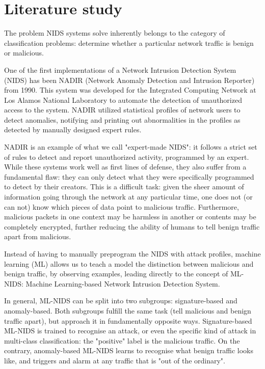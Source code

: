 \section{Literature study}\label{lit_study}
The problem NIDS systems solve inherently belongs to the category of classification problems: determine whether a particular network traffic is benign or malicious.

One of the first implementations of a Network Intrusion Detection System (NIDS) has been NADIR (Network Anomaly Detection and Intrusion Reporter) \cite{nadir} from 1990. This system was developed for the Integrated Computing Network at Los Alamos National Laboratory to automate the detection of unauthorized access to the system. NADIR utilized statistical profiles of network users to detect anomalies, notifying and printing out abnormalities in the profiles as detected by manually designed expert rules.

NADIR is an example of what we call "expert-made NIDS": it follows a strict set of rules to detect and report unauthorized activity, programmed by an expert. While these systems work well as first lines of defense, they also suffer from a fundamental flaw: they can only detect what they were specifically programmed to detect by their creators. This is a difficult task: given the sheer amount of information going through the network at any particular time, one does not (or can not) know which pieces of data point to malicious traffic. Furthermore, malicious packets in one context may be harmless in another or contents may be completely encrypted, further reducing the ability of humans to tell benign traffic apart from malicious. 

Instead of having to manually preprogram the NIDS with attack profiles, machine learning (ML) allows us to teach a model the distinction between malicious and benign traffic, by observing examples, leading directly to the concept of ML-NIDS: Machine Learning-based Network Intrusion Detection System.

In general, ML-NIDS can be split into two subgroups: signature-based and anomaly-based. Both subgroups fulfill the same task (tell malicious and benign traffic apart), but approach it in fundamentally opposite ways. Signature-based ML-NIDS is trained to recognise an attack, or even the specific kind of attack in multi-class classification: the "positive" label is the malicious traffic. On the contrary, anomaly-based ML-NIDS learns to recognise what benign traffic looks like, and triggers and alarm at any traffic that is "out of the ordinary". 

